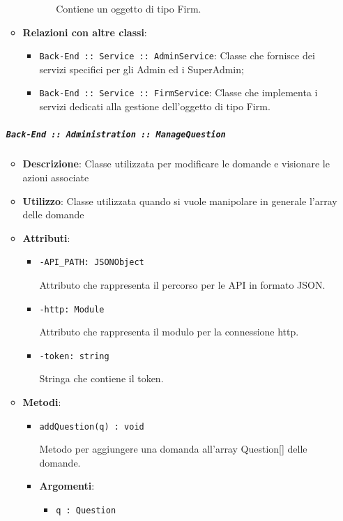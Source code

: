 \documentclass[../DefinizioneDiProdotto.tex]{subfiles}
\begin{document}
\begin{itemize}
\begin{itemize}
\begin{itemize}
\begin{itemize}
	 Contiene un oggetto di tipo Firm.
	\end{itemize}
	\end{itemize}\vspace{0.5em}
	\item \textbf{Relazioni con altre classi}:
	\begin{itemize}
	\item \texttt{Back-End :: Service :: AdminService}: Classe che fornisce dei servizi specifici per gli Admin ed i SuperAdmin;
	\item \texttt{Back-End :: Service :: FirmService}: Classe che implementa i servizi dedicati alla gestione dell'oggetto di tipo Firm.
	\end{itemize}
	\end{itemize}\subparagraph{\texttt{Back-End :: Administration :: ManageQuestion}}
	\begin{itemize}\item \textbf{Descrizione}: Classe utilizzata per modificare le domande e visionare le azioni associate
	\item \textbf{Utilizzo}: Classe utilizzata quando si vuole manipolare in generale l'array delle domande
	\item \textbf{Attributi}:
	\begin{itemize}
	\item \texttt{-API\_PATH: JSONObject}\

	 Attributo che rappresenta il percorso per le API in formato JSON.
	\end{itemize}
	\begin{itemize}
	\item \texttt{-http: Module}\

	 Attributo che rappresenta il modulo per la connessione http.
	\end{itemize}
	\begin{itemize}
	\item \texttt{-token: string}\

	 Stringa che contiene il token.
	\end{itemize}
	\item \textbf{Metodi}:
	\begin{itemize}
	\item \texttt{addQuestion(q) : void}\

	 Metodo per aggiungere una domanda all'array Question[] delle domande.

	\item \textbf{Argomenti}:
	\begin{itemize}
	\item \texttt{q : Question}\


\end{itemize}
\end{itemize}
\end{itemize}
\end{itemize}
\end{document}
